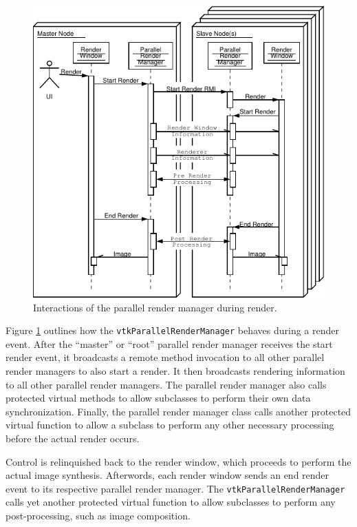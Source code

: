 \documentclass{acmsiggraph}
\newcommand{\cidentifier}[1]{\texttt{#1}}
\begin{document}
  \begin{figure}
    \begin{center}
      \includegraphics[width=\linewidth]
		      {images/ParallelRenderManagerInteraction}
    \end{center}
    \caption{Interactions of the parallel render manager during render.}
    \label{fig:parallel_render_manager_interaction}
  \end{figure}
  Figure \ref{fig:parallel_render_manager_interaction} outlines how the
  \cidentifier{vtk\-Parallel\-Render\-Manager} behaves during a render
  event.  After the ``master'' or ``root'' parallel render manager receives
  the start render event, it broadcasts a remote method invocation to all
  other parallel render managers to also start a render.  It then
  broadcasts rendering information to all other parallel render managers.
  The parallel render manager also calls protected virtual methods to allow
  subclasses to perform their own data synchronization.  Finally, the
  parallel render manager class calls another protected virtual function to
  allow a subclass to perform any other necessary processing before the
  actual render occurs.

  Control is relinquished back to the render window, which proceeds to
  perform the actual image synthesis.  Afterwords, each render window sends
  an end render event to its respective parallel render manager.  The
  \cidentifier{vtk\-Parallel\-Render\-Manager} calls yet another protected
  virtual function to allow subclasses to perform any post-processing, such
  as image composition.
\end{document}
